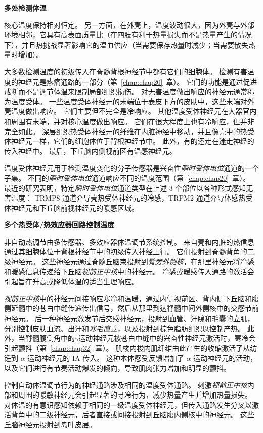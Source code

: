 \textbf{多处检测体温}

核心温度保持相对恒定。
另一方面，在外壳上，温度波动很大，因为外壳与外部环境相邻，它具有高表面质量比（在四肢有利于热量损失而不是热量产生的情况下），并且热挑战显著影响它的温血供应（当需要保存热量时减少；当需要散失热量时增加）。


大多数检测温度的初级传入在脊髓背根神经节中都有它们的细胞体。
检测有害温度的神经元是疼痛通路的一部分（第~\ref{chap:chap20}~章）。
它们的功能是通过促进戒断而不是调节体温来限制局部组织损伤。
对无害温度做出响应的神经元通常称为温度受体。
一些温度受体神经元的末端位于表皮下方的皮肤中，这些末端对外壳温度做出响应。
它们主要但不完全是冷响应。
其他温度受体神经元在大器官内和周围有末端，并对核心温度做出响应。
它们在很大程度上也有冷响应，但并非完全如此。
深层组织热受体神经元的纤维在内脏神经中移动，并且像壳中的热受体神经元一样，它们的细胞体位于背根神经节中。
此外，有的还走在迷走神经的传入神经中。
最后，下丘脑内侧视前区有温感神经元。


温度受体神经元用于检测温度变化的分子传感器是兴奋性\textit{瞬时受体电位}通道的一个子集。
不同的\textit{瞬时受体电位}通道响应不同的温度范围（第~\ref{chap:chap20}~章）。
最近的研究表明，特定\textit{瞬时受体电位}通道类型在上述 3 个部位以各种形式感知无害温度：
TRMP8 通道介导壳热受体神经元的冷感，TRPM2 通道介导体感热受体神经元和下丘脑前视神经元的暖感区域。


\textbf{多个热受体/热效应器回路控制温度}

非自动热调节由多传感器、多效应器体温调节系统控制。
来自壳和内脏的热信息通过其细胞体位于背根神经节中的初级传入神经上行。
它们投射到脊髓背角的二级神经元。
这些神经元通过脊髓丘脑束投射到\textit{臂旁外侧核}，在那里神经元将冷感和暖感信息传递给下丘脑\textit{视前正中核}中的神经元。
冷感或暖感传入通路的激活会引起旨在升高或降低体温的适当生理响应。


\textit{视前正中核}中的神经元间接响应寒冷和温暖，通过内侧视前区、背内侧下丘脑和腹侧延髓中的苍白中缝传递传出信号，然后从那里到达脊髓中间外侧核中的交感节前神经元。
后一种神经元激发节后交感神经元，投射到血管、汗腺和毛囊的立肌，分别控制皮肤血流、出汗和\textit{寒毛直立}，以及投射到棕色脂肪组织以控制产热。
此外，当脊髓腹侧角中的$\gamma$运动神经元被苍白中缝中的兴奋性神经元激活时，寒冷会引起颤抖（第~\ref{chap:chap32}~章）。
肌梭内梭内肌纤维由此产生的收缩激活了从纺锤到 $ \alpha $ 运动神经元的 IA 传入。
这种本体感受反馈增加了 $ \alpha $ 运动神经元的活动，以及它们进行有节奏活动爆发的倾向，导致肌肉张力增加和明显的颤抖。


控制自动体温调节行为的神经通路涉及相同的温度受体通路。
刺激\textit{视前正中核}内部和周围的暖敏神经元会引起显著的寻冷行为，减少热量产生并增加热量损失。
对体温的有意识感知依赖于相同的一级温度受体神经元，但传入通路发生分叉以激活背角中的二级神经元，后者直接或间接投射到丘脑腹内侧核中的神经元。
这些丘脑神经元投射到岛叶皮层。


